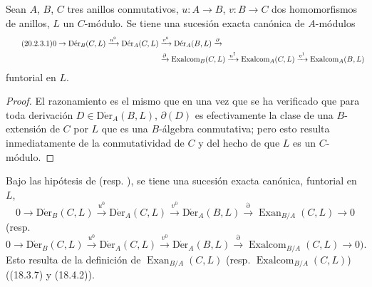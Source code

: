 \begin{corollary}[20.2.3]
\label{0.20.2.3-fr}
Sean $A$, $B$, $C$ tres anillos conmutativos, $u:A\to B$, $v:B\to C$
dos homomorfismos de anillos, $L$ un $C$-módulo. Se tiene una sucesión exacta
canónica de $A$-módulos
\begin{align}
\tag{20.2.3.1}
\label{0.20.2.3.1-fr}
  0\to\operatorname{D\acute{e}r}_B(C,L)\xrightarrow{u^0}
  \operatorname{D\acute{e}r}_A(C,L)&\xrightarrow{v^0}
  \operatorname{D\acute{e}r}_A(B,L)\xrightarrow{\partial} \\
  &\xrightarrow{\partial}\operatorname{Exalcom}_B(C,L)\xrightarrow{u^1}
  \operatorname{Exalcom}_A(C,L)\xrightarrow{v^1}
  \operatorname{Exalcom}_A(B,L) \notag
\end{align}
funtorial en $L$.
\end{corollary}

\begin{proof}
El razonamiento es el mismo que en  una vez que se ha
verificado que para toda derivación $D\in\operatorname{D\acute{e}r}_A(B,L)$,
$\partial(D)$ es efectivamente la clase de una $B$-extensión de $C$ por $L$ que es
una $B$-álgebra conmutativa; pero esto resulta inmediatamente de la conmutatividad
de $C$ y del hecho de que $L$ es un $C$-módulo.
\end{proof}

\begin{corollary}[20.2.4]
\label{0.20.2.4-fr}
Bajo las hipótesis de  \textup{(resp.
)}, se tiene una sucesión exacta canónica, funtorial en $L$,
\begin{equation}
\tag{20.2.4.1}
\label{0.20.2.4.1-fr}
  0\to\operatorname{D\acute{e}r}_B(C,L)\xrightarrow{u^0}
  \operatorname{D\acute{e}r}_A(C,L)\xrightarrow{v^0}
  \operatorname{D\acute{e}r}_A(B,L)\xrightarrow{\partial}
  \operatorname{Exan}_{B/A}(C,L)\to0
\end{equation}
\textup{(resp.}
\begin{equation}
\tag{20.2.4.2}
\label{0.20.2.4.2-fr}
  0\to\operatorname{D\acute{e}r}_B(C,L)\xrightarrow{u^0}
  \operatorname{D\acute{e}r}_A(C,L)\xrightarrow{v^0}
  \operatorname{D\acute{e}r}_A(B,L)\xrightarrow{\partial}
  \operatorname{Exalcom}_{B/A}(C,L)\to0\text{).}
\end{equation}
Esto resulta de la definición de $\operatorname{Exan}_{B/A}(C,L)$ (resp.
$\operatorname{Exalcom}_{B/A}(C,L)$) ((18.3.7) y (18.4.2)).
\end{corollary}

